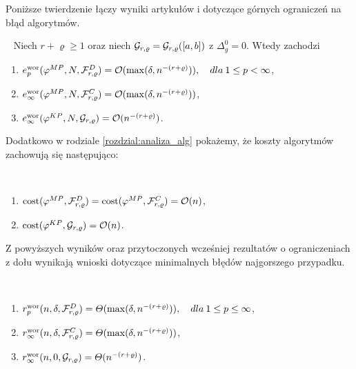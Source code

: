 \documentclass[oik, pdftex, robocza, man]{mgrwms}
\begin{document}
    Poniższe twierdzenie łączy wyniki artykułów \cite{CoDF} i \cite{AoP} dotyczące górnych ograniczeń na błąd algorytmów.
    
    \begin{thm} \label{thm:1:ograniczenia_z_gory}~%
        Niech $r+\varrho \geq 1$ oraz niech $\mathcal{G}_{r,\varrho} = \mathcal{G}_{r,\varrho}([a,b])$ z $\Delta_{g}^{0} = 0$. Wtedy zachodzi
        \begin{enumerate}[label=(\roman*)]
            \item \label{thm:1:i}$e_{p}^{\mathrm{wor}}(\varphi^{MP},N,\mathcal{F}_{r,\varrho}^{D}) = \mathcal{O}(\max(\delta, n^{-(r+\varrho)})), \quad dla \: 1 \leq p < \infty$,
            \item \label{thm:1:ii}$e_{\infty}^{\mathrm{wor}}(\varphi^{MP},N,\mathcal{F}_{r,\varrho}^{C}) = \mathcal{O}(\max(\delta, n^{-(r+\varrho)}))$,
            \item \label{thm:1:iii}$e_{\infty}^{\mathrm{wor}}(\varphi^{KP},N,\mathcal{G}_{r,\varrho}) = \mathcal{O}(n^{-(r+\varrho)})$.
        \end{enumerate}
    \end{thm}

    Dodatkowo w rodziale \ref{rozdzial:analiza_alg} pokażemy, że koszty algorytmów zachowują się następująco:

    \begin{stw}~%
        \begin{enumerate}
            \item $\mathrm{cost}(\varphi^{MP}, \mathcal{F}_{r,\varrho}^{D}) = \mathrm{cost}(\varphi^{MP}, \mathcal{F}_{r,\varrho}^{C}) = \mathcal{O}(n)$,
            \item $\mathrm{cost}(\varphi^{KP}, \mathcal{G}_{r,\varrho}) = \mathcal{O}(n)$.
        \end{enumerate}
    \end{stw}

    Z powyższych wyników oraz przytoczonych wcześniej rezultatów o ograniczeniach z dołu wynikają wnioski dotyczące minimalnych błędów najgorszego przypadku.

    \begin{cor}~
        \begin{enumerate}[label=(\roman*)]
            \item $r^{\mathrm{wor}}_{p}(n, \delta, \mathcal{F}^{D}_{r,\varrho}) = \varTheta(\max(\delta, n^{-(r+\varrho)})), \quad dla \: 1 \leq p \leq \infty$,
            \item $r^{\mathrm{wor}}_{\infty}(n, \delta, \mathcal{F}^{C}_{r,\varrho}) = \varTheta(\max(\delta, n^{-(r+\varrho)}))$,
            \item $r^{\mathrm{wor}}_{\infty}(n, 0, \mathcal{G}_{r,\varrho}) = \varTheta(n^{-(r+\varrho)})$.
        \end{enumerate}
    \end{cor}
    
\end{document}
